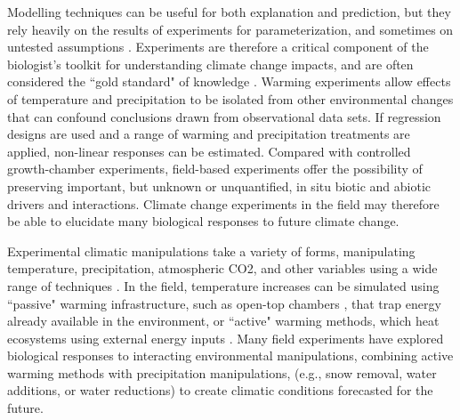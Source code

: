 \documentclass{article}
\begin{document}
Modelling techniques can be useful for both explanation and prediction, but they rely heavily on the results of experiments for parameterization, and sometimes on untested assumptions \citep [i.e.,][]{pearson2004,ibanez2006,swab2012}.  Experiments are therefore a critical component of the biologist's toolkit for understanding climate change impacts, and are often considered the ``gold standard" of knowledge%
\citep[e.g., ][]{box1978,gelman2014}. Warming experiments allow effects of temperature and  precipitation to be isolated from other  environmental changes that can confound conclusions drawn from observational data sets. If regression designs are used and a range of warming and precipitation treatments are applied, non-linear responses can be estimated. Compared with controlled growth-chamber experiments, field-based experiments offer the possibility of preserving important, but unknown or unquantified, in situ biotic and abiotic drivers and interactions. Climate change experiments in the field may therefore be able to elucidate many biological responses to future climate change.
\par Experimental climatic manipulations take a variety of forms, manipulating temperature, precipitation, atmospheric CO2, and other variables using a wide range of techniques \citep{shaver2000,aronson2009}. %
In the field, temperature increases can be simulated using ``passive" warming infrastructure, such as open-top chambers%
, that trap energy already available in the environment, or ``active" warming methods, which heat ecosystems using external energy inputs  \citep[e.g., gas-powered forced air heaters, electrical-powered soil warming cables, or infrared heaters;][]{shaver2000}. Many field experiments have explored biological responses to interacting environmental manipulations, combining active warming methods  with precipitation manipulations, (e.g., snow removal,  water additions, or water reductions) to create  climatic  conditions  forecasted for the  future\citep [e.g.,][]{price1998,cleland2006,sherry2007,rollinson2012}.
\end{document}
